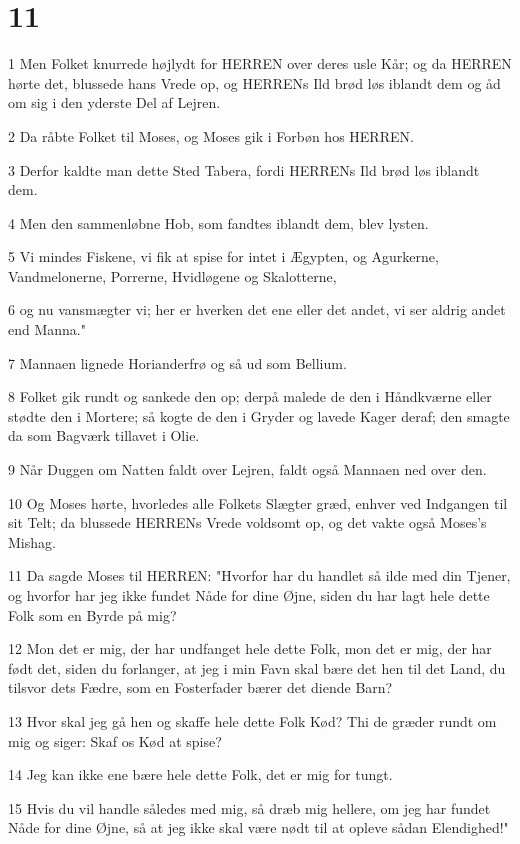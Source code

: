 \chapter{11}

\par 1 Men Folket knurrede højlydt for HERREN over deres usle Kår; og da HERREN hørte det, blussede hans Vrede op, og HERRENs Ild brød løs iblandt dem og åd om sig i den yderste Del af Lejren.
\par 2 Da råbte Folket til Moses, og Moses gik i Forbøn hos HERREN.
\par 3 Derfor kaldte man dette Sted Tabera, fordi HERRENs Ild brød løs iblandt dem.
\par 4 Men den sammenløbne Hob, som fandtes iblandt dem, blev lysten.
\par 5 Vi mindes Fiskene, vi fik at spise for intet i Ægypten, og Agurkerne, Vandmelonerne, Porrerne, Hvidløgene og Skalotterne,
\par 6 og nu vansmægter vi; her er hverken det ene eller det andet, vi ser aldrig andet end Manna."
\par 7 Mannaen lignede Horianderfrø og så ud som Bellium.
\par 8 Folket gik rundt og sankede den op; derpå malede de den i Håndkværne eller stødte den i Mortere; så kogte de den i Gryder og lavede Kager deraf; den smagte da som Bagværk tillavet i Olie.
\par 9 Når Duggen om Natten faldt over Lejren, faldt også Mannaen ned over den.
\par 10 Og Moses hørte, hvorledes alle Folkets Slægter græd, enhver ved Indgangen til sit Telt; da blussede HERRENs Vrede voldsomt op, og det vakte også Moses's Mishag.
\par 11 Da sagde Moses til HERREN: "Hvorfor har du handlet så ilde med din Tjener, og hvorfor har jeg ikke fundet Nåde for dine Øjne, siden du har lagt hele dette Folk som en Byrde på mig?
\par 12 Mon det er mig, der har undfanget hele dette Folk, mon det er mig, der har født det, siden du forlanger, at jeg i min Favn skal bære det hen til det Land, du tilsvor dets Fædre, som en Fosterfader bærer det diende Barn?
\par 13 Hvor skal jeg gå hen og skaffe hele dette Folk Kød? Thi de græder rundt om mig og siger: Skaf os Kød at spise?
\par 14 Jeg kan ikke ene bære hele dette Folk, det er mig for tungt.
\par 15 Hvis du vil handle således med mig, så dræb mig hellere, om jeg har fundet Nåde for dine Øjne, så at jeg ikke skal være nødt til at opleve sådan Elendighed!"
